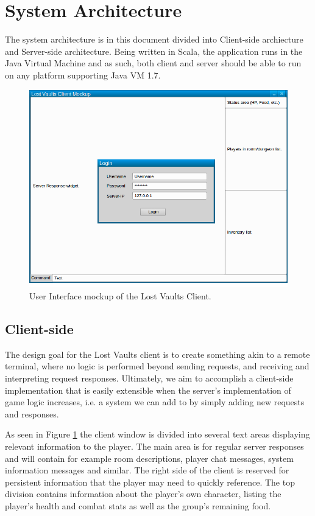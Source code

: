 \documentclass[a4paper]{article}
\begin{document}
\section{System Architecture}
The system architecture is in this document divided into  Client-side archiecture and Server-side architecture. Being written in Scala, the application runs in the Java Virtual Machine and as such, both client and server should be able to run on any platform supporting Java VM 1.7.
\begin{figure}[hbt]
\centering
\includegraphics[width=1.0\textwidth]{clientmockup}
\caption{\label{fig:Client}User Interface mockup of the Lost Vaults Client.}
\end{figure}
\subsection{Client-side}
The design goal for the Lost Vaults client is to create something akin to a remote terminal, where no logic is performed beyond sending requests, and receiving and interpreting request responses. Ultimately, we aim to accomplish a client-side implementation that is easily extensible when the server's implementation of game logic increases, i.e. a system we can add to by simply adding new requests and responses.

As seen in Figure \ref{fig:Client} the client window is divided into several text areas displaying relevant information to the player. The main area is for regular server responses and will contain for example room descriptions, player chat messages, system information messages and similar.
The right side of the client is reserved for persistent information that the player may need to quickly reference. The top division contains information about the player's own character, listing the player's health and combat stats as well as the group's remaining food.
\end{document}
